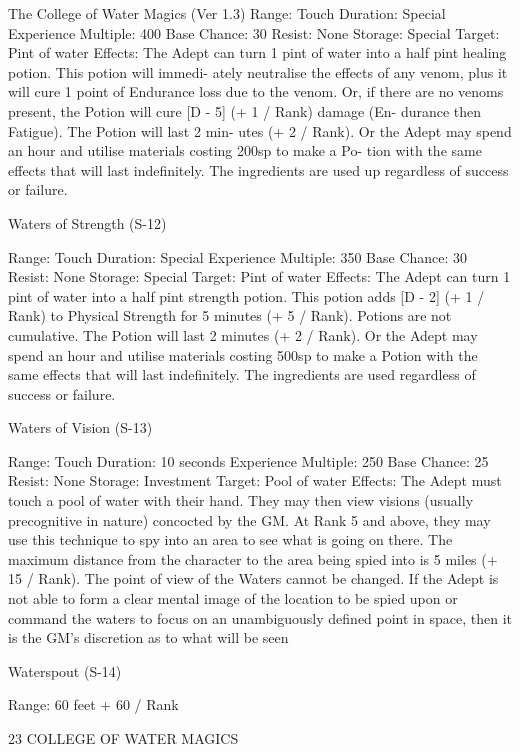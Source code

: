 \begin{Chapter}{The College of Water Magics (Ver 1.3)}
Range: Touch 
Duration: Special 
Experience Multiple: 400 
Base Chance: 30%
Resist: None 
Storage: Special 
Target: Pint of water 
Effects:  The  Adept  can  turn 1  pint  of  water  into  a 
half  pint  healing  potion.  This  potion  will  immedi-
ately  neutralise  the  effects  of  any  venom,  plus  it 
will  cure  1  point  of  Endurance  loss  due  to  the 
venom.  Or,  if  there  are  no  venoms  present,  the 
Potion will cure [D - 5] (+ 1 / Rank) damage (En-
durance  then  Fatigue).  The  Potion  will  last  2  min-
utes (+ 2 / Rank). Or the Adept may spend an hour 
and  utilise  materials  costing  200sp  to  make  a  Po-
tion with the same effects that will last indefinitely. 
The  ingredients  are  used  up  regardless  of  success 
or failure. 

Waters of Strength (S-12) 

Range: Touch 
Duration: Special 
Experience Multiple: 350 
Base Chance: 30%
Resist: None 
Storage: Special 
Target: Pint of water 
Effects:  The  Adept  can  turn 1  pint  of  water  into  a 
half  pint  strength potion.  This  potion  adds  [D  -  2] 
(+ 1 / Rank) to Physical Strength for 5 minutes (+ 5 
/  Rank).  Potions  are  not  cumulative.  The  Potion 
will last 2 minutes (+ 2 / Rank). Or the Adept may 
spend  an  hour  and  utilise  materials  costing  500sp 
to make a Potion with the same effects that will last 
indefinitely. The ingredients are used regardless of 
success or failure. 

Waters of Vision (S-13) 

Range: Touch 
Duration: 10 seconds 
Experience Multiple: 250 
Base Chance: 25%
Resist: None 
Storage: Investment 
Target: Pool of water 
Effects: The Adept must touch a pool of water with 
their  hand.  They  may  then  view  visions  (usually 
precognitive  in  nature)  concocted  by  the  GM.  At 
Rank 5 and  above,  they  may  use  this  technique  to 
spy into an area to see what is going on there. The 
maximum  distance  from  the  character  to  the  area 
being spied into is 5 miles (+ 15 / Rank). The point 
of  view  of  the  Waters  cannot  be  changed.  If  the 
Adept  is  not  able  to  form a  clear  mental  image  of 
the  location  to  be  spied  upon  or  command  the 
waters to focus on an unambiguously defined point 
in  space,  then it is  the  GM’s  discretion  as to  what 
will be seen 

Waterspout (S-14) 

Range: 60 feet + 60 / Rank 

23 COLLEGE OF WATER MAGICS 


\end{Chapter}
